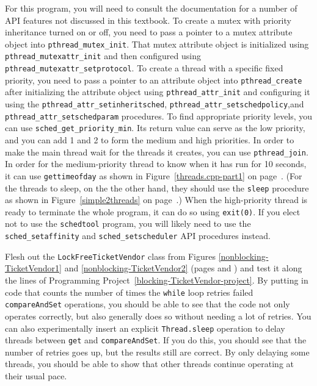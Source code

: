 \begin{chapterEnumerate}
For this program, you will need to consult the documentation for a number of API features not discussed in this textbook.  To create a mutex with priority inheritance turned on or off, you need to pass a pointer to a mutex attribute object into \verb|pthread_mutex_init|.  That mutex attribute object is initialized using \verb|pthread_mutexattr_init| and then configured using \verb|pthread_mutexattr_setprotocol|.  To create a thread with a specific fixed priority, you need to pass a pointer to an attribute object into \verb|pthread_create| after initializing the attribute object using \verb|pthread_attr_init| and configuring it using the \verb|pthread_attr_setinheritsched|, \verb|pthread_attr_setschedpolicy|,\linebreak[4] and \verb|pthread_attr_setschedparam| procedures.  To find appropriate priority levels, you can use \verb|sched_get_priority_min|.  Its return value can serve as the low priority, and you can add 1 and 2 to form the medium and high priorities.  In order to make the main thread wait for the threads it creates, you can use \verb|pthread_join|.  In order for the medium-priority thread to know when it has run for 10 seconds, it can use \verb|gettimeofday| as shown in Figure~\ref{threads.cpp-part1} on page~\pageref{threads.cpp-part1}.  (For the threads to sleep, on the the other hand, they should use the \verb|sleep| procedure as
shown in Figure~\ref{simple2threads} on page~\pageref{simple2threads}.)  When the high-priority thread is ready to terminate the whole program, it can do so using \verb|exit(0)|.
If you elect not to use the \verb|schedtool| program, you will likely need to use the \verb|sched_setaffinity| and \verb|sched_setscheduler| API procedures instead.
\item\label{nonblocking-TicketVendor-project}
Flesh out the \texttt{LockFreeTicketVendor} class from Figures \ref{nonblocking-TicketVendor1} and \ref{nonblocking-TicketVendor2} (pages \pageref{nonblocking-TicketVendor1} and \pageref{nonblocking-TicketVendor2}) and test it along the lines of Programming Project~\ref{blocking-TicketVendor-project}. By putting in code that counts the number of times the \texttt{while} loop retries failed \texttt{compareAndSet} operations, you should be able to see that the code not only operates correctly, but also generally does so without needing a lot of retries.  You can also experimentally insert an explicit \texttt{Thread.sleep} operation to delay threads between \texttt{get} and \texttt{compareAndSet}.  If you do this, you should see that the number of retries goes up, but the results still are correct.  By only delaying some threads, you should be able to show that other threads continue operating at their usual pace.
\end{chapterEnumerate}

